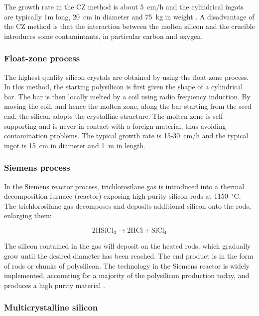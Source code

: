 The growth rate in the CZ method is about 5~cm/h and the cylindrical ingots are typically 1m long, 20~cm in diameter and 75~kg in weight \cite{solar_cells}. A disadvantage of the CZ method is that the interaction between the molten silicon and the crucible introduces some contamintants, in particular carbon and oxygen. 

\subsubsection{Float-zone process}

The highest quality silicon crystals are obtained by using the float-zone process. In this method, the starting polysilicon is first given the shape of a cylindrical bar. The bar is then locally melted by a coil using radio frequency induction. By moving the coil, and hence the molten zone, along the bar starting from the seed end, the silicon adopts the crystalline structure. The molten zone is self-supporting and is never in contact with a foreign material, thus avoiding contamination problems. The typical growth rate is 15-30~cm/h and the typical ingot is 15~cm in diameter and 1~m in length.

\subsubsection{Siemens process}

In the Siemens reactor process, trichlorosilane gas is introduced into a thermal decomposition furnace (reactor) exposing high-purity silicon rods at 1150~$^\circ$C. The trichlorosilane gas decomposes and deposits additional silicon onto the rods, enlarging them:

\begin{equation}
2 \text{HSiCl}_3 \rightarrow 2 \text{HCl} + \text{SiCl}_4
\label{eq:siemens}
\end{equation}

The silicon contained in the gas will deposit on the heated rods, which gradually grow until the desired diameter has been reached. The end product is in the form of rods or chunks of polysilicon. The technology in the Siemens reactor is widely implemented, accounting for a majority of the polysilicon production today, and produces a high purity material \cite{pv_handbook}.


\subsubsection{Multicrystalline silicon}

